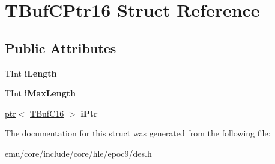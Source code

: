\hypertarget{struct_t_buf_c_ptr16}{}\section{T\+Buf\+C\+Ptr16 Struct Reference}
\label{struct_t_buf_c_ptr16}
\subsection*{Public Attributes}
\begin{DoxyCompactItemize}
\item 
\mbox{\label{struct_t_buf_c_ptr16_aa9b21035096b6de8d5791b04b70378ec}} 
T\+Int {\bfseries i\+Length}
\item 
\mbox{\label{struct_t_buf_c_ptr16_a972757937a73332066606a4137dba7db}} 
T\+Int {\bfseries i\+Max\+Length}
\item 
\mbox{\label{struct_t_buf_c_ptr16_abf2e7667b184bc404455b0d859892bdd}} 
\mbox{\hyperlink{classeka2l1_1_1ptr}{ptr}}$<$ \mbox{\hyperlink{struct_t_buf_c16}{T\+Buf\+C16}} $>$ {\bfseries i\+Ptr}
\end{DoxyCompactItemize}


The documentation for this struct was generated from the following file\+:\begin{DoxyCompactItemize}
\item 
emu/core/include/core/hle/epoc9/des.\+h\end{DoxyCompactItemize}
